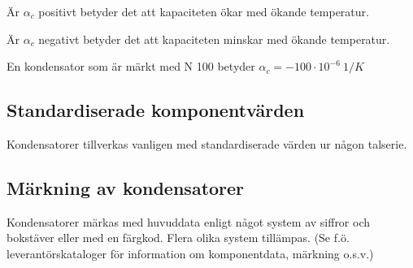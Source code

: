 Är \(\alpha _c\) positivt betyder det att kapaciteten ökar med ökande
temperatur.

Är \(\alpha _c\) negativt betyder det att kapaciteten minskar med ökande
temperatur.

En kondensator som är märkt med N 100 betyder
\(\alpha _c = -100 \cdot 10^{-6}\ 1/K\)

\subsection{Standardiserade komponentvärden}

Kondensatorer tillverkas vanligen med standardiserade värden ur någon talserie.

\subsection{Märkning av kondensatorer}

Kondensatorer märkas med huvuddata enligt något system av siffror och bokstäver
eller med en färgkod. Flera olika system tillämpas.
(Se f.ö. leverantörskataloger för information om komponentdata, märkning o.s.v.)
